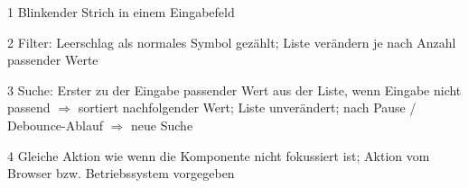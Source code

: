 \begin{table}[!htb]
\begin{adjustbox}{max width=\textwidth}
\begin{threeparttable}
\begin{tablenotes}
                \scriptsize
                \item[1] Blinkender Strich in einem Eingabefeld
                \item[2] Filter: Leerschlag als normales Symbol gezählt; Liste verändern je nach Anzahl passender Werte
                \item[3] Suche: Erster zu der Eingabe passender Wert aus der Liste, wenn Eingabe nicht passend $\Rightarrow$ sortiert nachfolgender Wert; 
                                Liste unverändert; nach Pause / Debounce-Ablauf $\Rightarrow$ neue Suche
                \item[4] Gleiche Aktion wie wenn die Komponente nicht fokussiert ist; Aktion vom Browser bzw. Betriebssystem vorgegeben
            \end{tablenotes}
        \end{threeparttable}
    \end{adjustbox}
\end{table}

